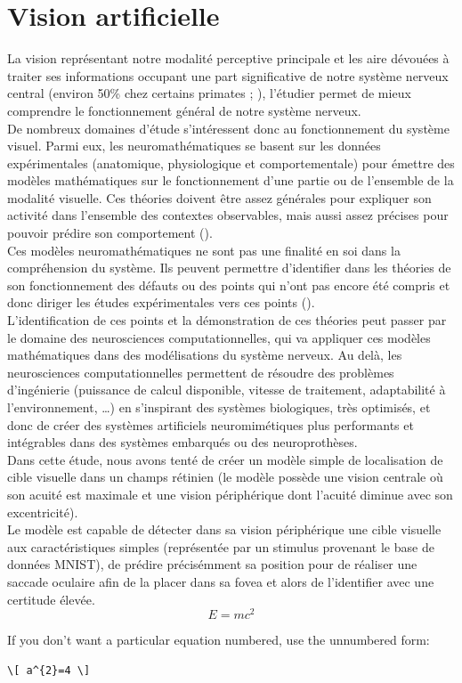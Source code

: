 \section{Vision artificielle}
La vision représentant notre modalité perceptive principale et les aire dévouées à traiter ses informations occupant une part significative de notre système nerveux central (environ 50\% chez certains primates ; \cite{Zhaoping2014}), l'étudier permet de mieux comprendre le fonctionnement général de notre système nerveux.\\
De nombreux domaines d'étude s'intéressent donc au fonctionnement du système visuel. Parmi eux, les neuromathématiques se basent sur les données expérimentales (anatomique, physiologique et comportementale) pour émettre des modèles mathématiques sur le fonctionnement d'une partie ou de l'ensemble de la modalité visuelle. Ces théories doivent être assez générales pour expliquer son activité dans l'ensemble des contextes observables, mais aussi assez précises pour pouvoir prédire son comportement (\cite{Zhaoping2014}).\\
Ces modèles neuromathématiques ne sont pas une finalité en soi dans la compréhension du système. Ils peuvent permettre d'identifier dans les théories de son fonctionnement des défauts ou des points qui n'ont pas encore été compris et donc diriger les études expérimentales vers ces points (\cite{Zhaoping2014}).\\
L'identification de ces points et la démonstration de ces théories peut passer par le domaine des neurosciences computationnelles, qui va appliquer ces modèles mathématiques dans des modélisations du système nerveux. Au delà, les neurosciences computationnelles permettent de résoudre des problèmes d'ingénierie (puissance de calcul disponible, vitesse de traitement, adaptabilité à l'environnement, \ldots) en s'inspirant des systèmes biologiques, très optimisés, et donc de créer des systèmes artificiels neuromimétiques plus performants et intégrables dans des systèmes embarqués ou des neuroprothèses.\\

Dans cette étude, nous avons tenté de créer un modèle simple de localisation de cible visuelle dans un champs rétinien (le modèle possède une vision centrale où son acuité est maximale et une vision périphérique dont l'acuité diminue avec son excentricité).\\
Le modèle est capable de détecter dans sa vision périphérique une cible visuelle aux caractéristiques simples (représentée par un stimulus provenant le base de données MNIST), de prédire précisémment sa position pour de réaliser une saccade oculaire afin de la placer dans sa fovea et alors de l'identifier avec une certitude élevée.\\

\begin{equation}
E = mc^{2}
\label{eqn:Einstein}
\end{equation}

If you don't want a particular equation numbered, use the unnumbered form:
\begin{verbatim}
\[ a^{2}=4 \]
\end{verbatim}
